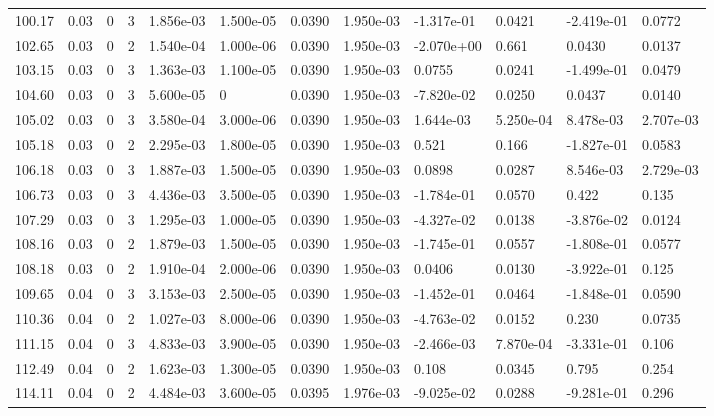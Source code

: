 \documentclass[preview]{standalone}
\begin{document}
{{{{{\begin{tabular}{L{1.2cm}C{1.2cm} C{0.3cm}C{0.5cm} C{1.4cm}C{1.4cm} C{1.4cm}C{1.4cm} C{1.6cm}C{1.6cm} C{1.6cm}C{1.6cm}}
  100.17  &  0.03  & 0     &  3 &  1.856e-03  & 1.500e-05  &  0.0390&   1.950e-03& -1.317e-01 & 0.0421   &  -2.419e-01 & 0.0772  \\ 
  102.65  &  0.03  & 0     &  2 &  1.540e-04  & 1.000e-06  &  0.0390&   1.950e-03& -2.070e+00 & 0.661   &  0.0430 & 0.0137  \\ 
  103.15  &  0.03  & 0     &  3 &  1.363e-03  & 1.100e-05  &  0.0390&   1.950e-03& 0.0755 & 0.0241   &  -1.499e-01 & 0.0479  \\ 
  104.60  &  0.03  & 0     &  3 &  5.600e-05  & 0  &  0.0390&   1.950e-03& -7.820e-02 & 0.0250   &  0.0437 & 0.0140  \\ 
  105.02  &  0.03  & 0     &  3 &  3.580e-04  & 3.000e-06  &  0.0390&   1.950e-03& 1.644e-03 & 5.250e-04   &  8.478e-03 & 2.707e-03  \\ 
  105.18  &  0.03  & 0     &  2 &  2.295e-03  & 1.800e-05  &  0.0390&   1.950e-03& 0.521 & 0.166   &  -1.827e-01 & 0.0583  \\ 
  106.18  &  0.03  & 0     &  3 &  1.887e-03  & 1.500e-05  &  0.0390&   1.950e-03& 0.0898 & 0.0287   &  8.546e-03 & 2.729e-03  \\ 
  106.73  &  0.03  & 0     &  3 &  4.436e-03  & 3.500e-05  &  0.0390&   1.950e-03& -1.784e-01 & 0.0570   &  0.422 & 0.135  \\ 
  107.29  &  0.03  & 0     &  3 &  1.295e-03  & 1.000e-05  &  0.0390&   1.950e-03& -4.327e-02 & 0.0138   &  -3.876e-02 & 0.0124  \\ 
  108.16  &  0.03  & 0     &  2 &  1.879e-03  & 1.500e-05  &  0.0390&   1.950e-03& -1.745e-01 & 0.0557   &  -1.808e-01 & 0.0577  \\ 
  108.18  &  0.03  & 0     &  2 &  1.910e-04  & 2.000e-06  &  0.0390&   1.950e-03& 0.0406 & 0.0130   &  -3.922e-01 & 0.125  \\ 
  109.65  &  0.04  & 0     &  3 &  3.153e-03  & 2.500e-05  &  0.0390&   1.950e-03& -1.452e-01 & 0.0464   &  -1.848e-01 & 0.0590  \\ 
  110.36  &  0.04  & 0     &  2 &  1.027e-03  & 8.000e-06  &  0.0390&   1.950e-03& -4.763e-02 & 0.0152   &  0.230 & 0.0735  \\ 
  111.15  &  0.04  & 0     &  3 &  4.833e-03  & 3.900e-05  &  0.0390&   1.950e-03& -2.466e-03 & 7.870e-04   &  -3.331e-01 & 0.106  \\ 
  112.49  &  0.04  & 0     &  2 &  1.623e-03  & 1.300e-05  &  0.0390&   1.950e-03& 0.108 & 0.0345   &  0.795 & 0.254  \\ 
  114.11  &  0.04  & 0     &  2 &  4.484e-03  & 3.600e-05  &  0.0395&   1.976e-03& -9.025e-02 & 0.0288   &  -9.281e-01 & 0.296  \\ 

\end{tabular}}}}}}
\end{document}
